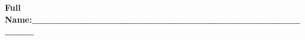 \usepackage{times}
\usepackage{alltt}
\usepackage{exam}
\usepackage[dvips]{graphicx} 

\oddsidemargin 0pt
\evensidemargin 0pt
\textheight 600pt
\textwidth 469pt
\setlength{\parindent}{2em}
\setlength{\parskip}{1ex}


\begin{flushright}
{\large\bf Full Name:\_\_\_\_\_\_\_\_\_\_\_\_\_\_\_\_\_\_\_\_\_\_\_\_\_\_\_\_\_\_\_\_\_\_\_\_\_\_\_\_\_ } \\[1ex]
\end{flushright}
\vspace*{0.5 in}

